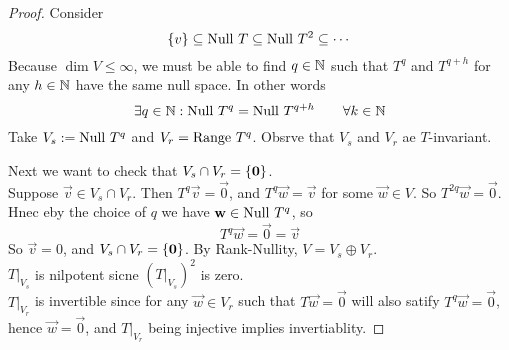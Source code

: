 \begin{proof}
Consider 
\[ \left\{ v \right\} \subseteq \text{Null } T \subseteq \text{Null } T^2 \subseteq \cdots\]
Because $\dim V \leq \infty$, we must be able to find $q \in \mathbb N$ such that $T^q$ and $T^{q+h}$ for any $h \in \mathbb N$ have the same null space. In other words 
\[ \exists q\in \mathbb N : \text{Null } T^q = \text{Null } T^{q + h} \qquad \forall k \in \mathbb N\]
Take $V_s : = \text{Null } T^q$ and $V_r = \text{Range } T^q$. Obsrve that $V_s$ and $V_r$ ae $T$-invariant. 

\noindent Next we want to check that $V_s \cap V_r = \left\{ \mathbf 0 \right\}$. \\ 
Suppose $\vec v \in V_s \cap V_r$. Then $T^q \vec v = \vec 0$, and $T^q \vec w = \vec v$ for some $\vec w \in V$. So $T^{2q}\vec w = \vec 0$. Hnec eby the choice of $q$ we have $\mathbf w \in \text{Null } T^q$, so \[T^q \vec w = \vec 0 = \vec v\]
So $\vec v = 0$, and $V_s \cap V_r = \left\{ \mathbf 0 \right\}$. By Rank-Nullity, $V = V_s \oplus V_r$. \\
$T\vert_{V_s}$ is nilpotent sicne $\left(T\vert_{V_s}\right)^2$ is zero. \\
$T\vert_{V_r}$ is invertible since for any $\vec w \in V_r$ such that $T \vec w = \vec 0$ will also satify $T^q \vec w = \vec 0$, hence $\vec w = \vec 0$, and $T\vert_{V_r}$ being injective implies invertiablity.
\end{proof}
\newpage
